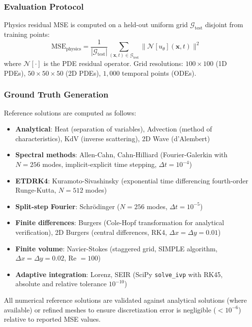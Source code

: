 \documentclass{article}
\theoremstyle{remark}
\begin{document}
\subsubsection{Evaluation Protocol}

Physics residual MSE is computed on a held-out uniform grid $\mathcal{G}_{\text{test}}$ disjoint from training points:
\begin{equation}
\text{MSE}_{\text{physics}} = \frac{1}{|\mathcal{G}_{\text{test}}|} \sum_{(\mathbf{x}, t) \in \mathcal{G}_{\text{test}}} \|\mathcal{N}[u_\theta](\mathbf{x}, t)\|^2
\end{equation}
where $\mathcal{N}[\cdot]$ is the PDE residual operator. Grid resolutions: $100 \times 100$ (1D PDEs), $50 \times 50 \times 50$ (2D PDEs), $1{,}000$ temporal points (ODEs).

\subsubsection{Ground Truth Generation}

Reference solutions are computed as follows:
\begin{itemize}
\item \textbf{Analytical}: Heat (separation of variables), Advection (method of characteristics), KdV (inverse scattering), 2D Wave (d'Alembert)
\item \textbf{Spectral methods}: Allen-Cahn, Cahn-Hilliard (Fourier-Galerkin with $N=256$ modes, implicit-explicit time stepping, $\Delta t = 10^{-4}$)
\item \textbf{ETDRK4}: Kuramoto-Sivashinsky (exponential time differencing fourth-order Runge-Kutta, $N=512$ modes)
\item \textbf{Split-step Fourier}: Schr\"odinger ($N=256$ modes, $\Delta t = 10^{-5}$)
\item \textbf{Finite differences}: Burgers (Cole-Hopf transformation for analytical verification), 2D Burgers (central differences, RK4, $\Delta x = \Delta y = 0.01$)
\item \textbf{Finite volume}: Navier-Stokes (staggered grid, SIMPLE algorithm, $\Delta x = \Delta y = 0.02$, Re $= 100$)
\item \textbf{Adaptive integration}: Lorenz, SEIR (SciPy \texttt{solve\_ivp} with RK45, absolute and relative tolerance $10^{-10}$)
\end{itemize}

All numerical reference solutions are validated against analytical solutions (where available) or refined meshes to ensure discretization error is negligible ($<10^{-6}$) relative to reported MSE values.
\end{document}

